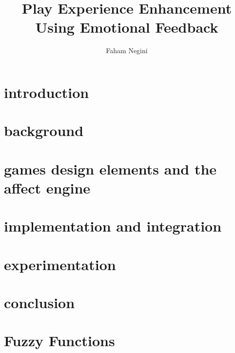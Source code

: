 \documentclass{uofsthesis-cs}
\title{Play Experience Enhancement Using Emotional Feedback}
\author{Faham Negini}
\begin{document}
\maketitle

\frontmatter


\chapter{introduction}                                
\chapter{background}                                  
\chapter{games design elements and the affect engine} 
\chapter{implementation and integration}              
\chapter{experimentation}                             
\chapter{conclusion}                                  




\uofsappendix
\chapter{Fuzzy Functions} 

\end{document}
